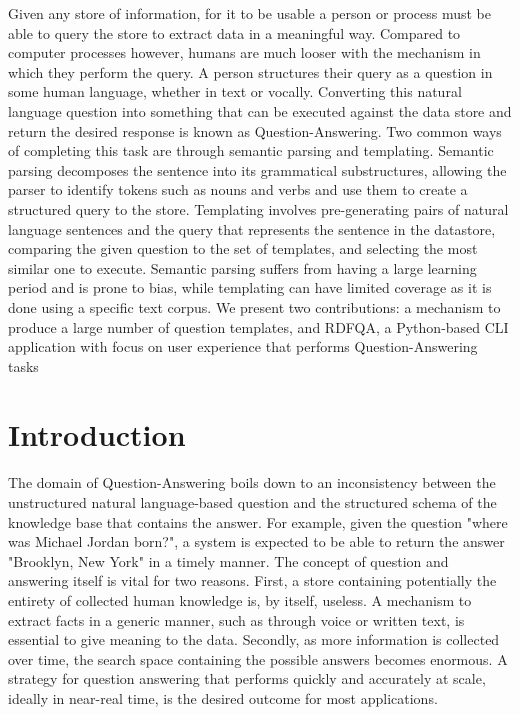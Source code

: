 \documentclass[sigplan,screen]{acmart}
\begin{document}
Given any store of information, for it to be usable a person or process must be able to query the store to extract data in a meaningful way. Compared to computer processes however, humans are much looser with the mechanism in which they perform the query. A person structures their query as a question in some human language, whether in text or vocally. Converting this natural language question into something that can be executed against the data store and return the desired response is known as Question-Answering. Two common ways of completing this task are through semantic parsing and templating. Semantic parsing decomposes the sentence into its grammatical substructures, allowing the parser to identify tokens such as nouns and verbs and use them to create a structured query to the store. Templating involves pre-generating pairs of natural language sentences and the query that represents the sentence in the datastore, comparing the given question to the set of templates, and selecting the most similar one to execute. Semantic parsing suffers from having a large learning period and is prone to bias, while templating can have limited coverage as it is done using a specific text corpus. We present two contributions: a mechanism to produce a large number of question templates, and RDFQA, a Python-based CLI application with focus on user experience that performs Question-Answering tasks

\section{Introduction}

The domain of Question-Answering boils down to an inconsistency between the unstructured natural language-based question and the structured schema of the knowledge base that contains the answer. For example, given the question "where was Michael Jordan born?", a system is expected to be able to return the answer "Brooklyn, New York" in a timely manner. The concept of question and answering itself is vital for two reasons. First, a store containing potentially the entirety of collected human knowledge is, by itself, useless. A mechanism to extract facts in a generic manner, such as through voice or written text, is essential to give meaning to the data. Secondly, as more information is collected over time, the search space containing the possible answers becomes enormous. A strategy for question answering that performs quickly and accurately at scale, ideally in near-real time, is the desired outcome for most applications.
\end{document}
